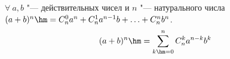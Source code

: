 \label{binom}
    $\forall\  a,b$ "--- действительных чисел и $n$ "--- натурального числа $(a+b)^n\hm=C_n^0a^n+C_n^1a^{n-1}b+\ldots+C_n^nb^n$.
    \[
        (a+b)^n\hm=\sum_{k\hm=0}^nC_n^ka^{n-k}b^k
    \]
